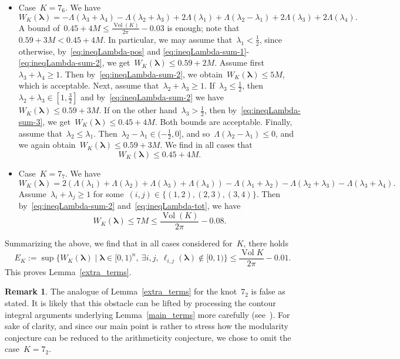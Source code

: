 \documentclass[11pt]{amsart}
\newcommand{\lambdab}{{\boldsymbol \lambda}}
\theoremstyle{definition}
\newtheorem{remark}{Remark}
\DeclareMathOperator{\Vol}{Vol}
\newcommand{\bs}{\boldsymbol }
\newcommand{\1}{{\mathbf 1}}
\numberwithin{equation}{section}
\begin{document}
\begin{itemize}
\item Case~$K = 7_6$. We have
  $$ W_K(\lambdab) = -\Lambda(\lambda_3 + \lambda_4) - \Lambda(\lambda_2 + \lambda_3) + 2\Lambda(\lambda_1) + \Lambda(\lambda_2-\lambda_1) + 2\Lambda(\lambda_3) + 2\Lambda(\lambda_4). $$
  A bound of~$0.45 + 4M \leq \frac{\Vol(K)}{2\pi} - 0.03$ is enough; note that~$0.59 + 3M < 0.45 + 4M$. In particular, we may assume that~$\lambda_1 < \frac12$, since otherwise, by~\eqref{eq:ineqLambda-pos} and \eqref{eq:ineqLambda-sum-1}-\eqref{eq:ineqLambda-sum-2}, we get~$W_K(\lambdab) \leq 0.59 + 2M$. Assume first~$\lambda_3 + \lambda_4 \geq 1$. Then by~\eqref{eq:ineqLambda-sum-2}, we obtain~$W_K(\lambdab) \leq 5M$, which is acceptable. Next, assume that~$\lambda_2 + \lambda_3 \geq 1$. If~$\lambda_3 \leq \frac12$, then~$\lambda_2 + \lambda_3 \in [1, \frac32]$ and by~\eqref{eq:ineqLambda-sum-2} we have~$W_K(\lambdab) \leq 0.59 + 3M$. If on the other hand~$\lambda_3 > \frac12$, then by~\eqref{eq:ineqLambda-sum-3}, we get~$W_K(\lambdab) \leq 0.45 + 4M$. Both bounds are acceptable. Finally, assume that~$\lambda_2 \leq \lambda_1$. Then~$\lambda_2 - \lambda_1 \in (-\frac12, 0]$, and so~$\Lambda(\lambda_2-\lambda_1) \leq 0$, and we again obtain~$W_K(\lambdab) \leq 0.59 + 3M$. We find in all cases that
  $$ W_K(\lambdab) \leq 0.45 + 4M. $$

\item Case~$K = 7_7$. We have
  $$ W_K(\lambdab) = 2(\Lambda(\lambda_1)+\Lambda(\lambda_2)+\Lambda(\lambda_3)+\Lambda(\lambda_4)) - \Lambda(\lambda_1 + \lambda_2) - \Lambda(\lambda_2+\lambda_3) - \Lambda(\lambda_3+\lambda_4). $$
  Assume~$\lambda_i + \lambda_j \geq 1$ for some~$(i, j)\in \{(1, 2), (2, 3), (3, 4)\}$. Then by~\eqref{eq:ineqLambda-sum-2} and~\eqref{eq:ineqLambda-tot}, we have
  $$ W_K(\lambdab) \leq 7M \leq \frac{\Vol(K)}{2\pi} - 0.08. $$
\end{itemize}


Summarizing the above, we find that in all cases considered for~$K$, there holds
\begin{equation}
  \label{eq:values-EK}
  E_K:=\sup\{W_K(\bs \lambda)\mid \bs \lambda\in[0,1)^n,\ \exists i,j,\ \ell_{i,j}(\bs \lambda)\notin[0,1)\} \leq \frac{\Vol K}{2\pi}-0.01.
\end{equation}
This proves Lemma~\ref{extra_terms}.


\begin{remark}
  The analogue of Lemma~\ref{extra_terms} for the knot~$7_2$ is false as stated. It is likely that this obstacle can be lifted by processing the contour integral arguments underlying Lemma~\ref{main_terms} more carefully (see~\cite[Remark~8.1]{Ohtsuki7}). For sake of clarity, and since our main point is rather to stress how the modularity conjecture can be reduced to the arithmeticity conjecture, we chose to omit the case~$K = 7_2$.
\end{remark}
\end{document}

